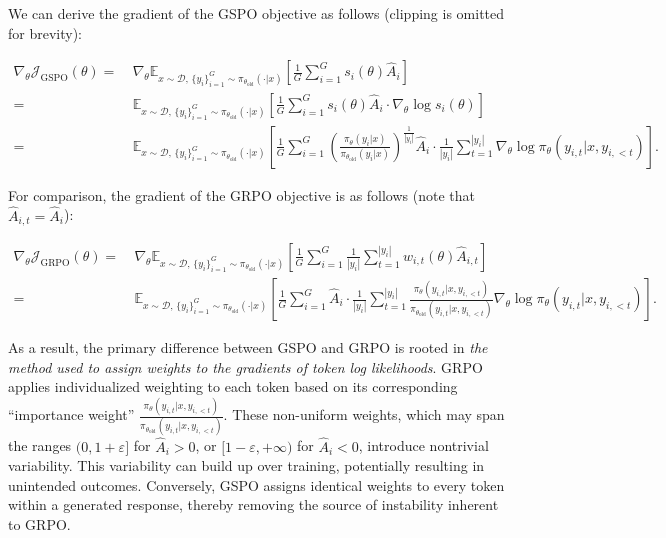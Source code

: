 We can derive the gradient of the GSPO objective as follows (clipping is omitted for brevity):

\begin{align}
\nabla_{\theta} \mathcal{J}_\text{GSPO} (\theta)
=&\ 
\nabla_{\theta} \mathbb{E}_{ x \sim \mathcal{D},\, \{y_i\}_{i=1}^G \sim \pi_{\theta_\text{old}}( \cdot | x) }
\left[ 
\frac{1}{G} \sum_{i=1}^{G} s_{i}(\theta) \widehat{A}_{i}
\right] \\
= &\ 
\mathbb{E}_{ x \sim \mathcal{D},\, \{y_i\}_{i=1}^G \sim \pi_{\theta_\text{old}}( \cdot | x) }
\left[ 
\frac{1}{G} \sum_{i=1}^{G}
s_{i}(\theta) \widehat{A}_{i}
\cdot \nabla_{\theta} \log s_{i}(\theta)
\right] \\
=&\ 
\mathbb{E}_{ x \sim \mathcal{D},\, \{y_i\}_{i=1}^G \sim \pi_{\theta_\text{old}}( \cdot | x) }
\left[ 
\frac{1}{G} \sum_{i=1}^{G} 
\left( \frac{ \pi_{\theta} (y_i | x) }{ \pi_{\theta_\text{old}} (y_i | x)} \right)^{\frac{1}{|y_i|}} \widehat{A}_{i} 
\cdot \frac{1}{|y_i|} \sum_{t=1}^{|y_i|} \nabla_{\theta} \log \pi_{\theta} (y_{i,t} | x, y_{i,<t}) 
\right].
\label{equ:gspo_grad}
\end{align}

For comparison, the gradient of the GRPO objective is as follows (note that $\widehat{A}_{i,t} = \widehat{A}_{i}$):

\begin{align}
\nabla_{\theta} \mathcal{J}_\text{GRPO} (\theta) 
=&\ 
\nabla_{\theta} \mathbb{E}_{ x \sim \mathcal{D},\, \{y_i\}_{i=1}^G \sim \pi_{\theta_\text{old}}( \cdot | x) }
\left[ \frac{1}{G} \sum_{i=1}^{G} \frac{1}{|y_i|} \sum_{t=1}^{|y_i|} 
w_{i,t}(\theta) \widehat{A}_{i,t}
\right] \\
=&\
\mathbb{E}_{ x \sim \mathcal{D},\, \{y_i\}_{i=1}^G \sim \pi_{\theta_\text{old}}( \cdot | x) }
\left[ \frac{1}{G} \sum_{i=1}^{G} \widehat{A}_{i} 
\cdot \frac{1}{|y_i|} \sum_{t=1}^{|y_i|} 
\frac{ \pi_{\theta} (y_{i,t} | x, y_{i,<t}) }{ \pi_{\theta_\text{old}} (y_{i,t} | x,y_{i,<t})} 
\nabla_{\theta} \log \pi_{\theta} (y_{i,t} | x, y_{i,<t})  
\right].
\end{align}

As a result, the primary difference between GSPO and GRPO is rooted in \textit{the method used to assign weights to the gradients of token log likelihoods}. GRPO applies individualized weighting to each token based on its corresponding ``importance weight'' $\frac{ \pi_{\theta} (y_{i,t} | x, y_{i,<t}) }{ \pi_{\theta_\text{old}} (y_{i,t} | x,y_{i,<t})}$. These non-uniform weights, which may span the ranges $(0, 1+\varepsilon]$ for $\widehat{A}_{i} >0$, or $[1-\varepsilon, +\infty)$ for $\widehat{A}_{i} < 0$, introduce nontrivial variability. This variability can build up over training, potentially resulting in unintended outcomes. Conversely, GSPO assigns identical weights to every token within a generated response, thereby removing the source of instability inherent to GRPO.

